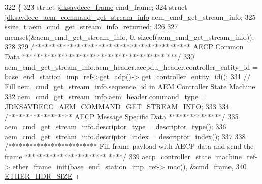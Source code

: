 \begin{DoxyCode}
322 \{
323     \textcolor{keyword}{struct }\hyperlink{structjdksavdecc__frame}{jdksavdecc\_frame} cmd\_frame;
324     \textcolor{keyword}{struct }\hyperlink{structjdksavdecc__aem__command__get__stream__info}{jdksavdecc\_aem\_command\_get\_stream\_info} 
      aem\_cmd\_get\_stream\_info;
325     ssize\_t aem\_cmd\_get\_stream\_info\_returned;
326 
327     memset(&aem\_cmd\_get\_stream\_info, 0, \textcolor{keyword}{sizeof}(aem\_cmd\_get\_stream\_info));
328 
329     \textcolor{comment}{/******************************************** AECP Common Data ****************************************
      ***/}
330     aem\_cmd\_get\_stream\_info.aem\_header.aecpdu\_header.controller\_entity\_id = 
      \hyperlink{classavdecc__lib_1_1descriptor__base__imp_a550c969411f5f3b69f55cc139763d224}{base\_end\_station\_imp\_ref}->\hyperlink{classavdecc__lib_1_1end__station__imp_a471a74540ce6182fad0c17dfd010107e}{get\_adp}()->
      \hyperlink{classavdecc__lib_1_1adp_a0c0959a46658c0a22e9530334b2912da}{get\_controller\_entity\_id}();
331     \textcolor{comment}{// Fill aem\_cmd\_get\_stream\_info.sequence\_id in AEM Controller State Machine}
332     aem\_cmd\_get\_stream\_info.aem\_header.command\_type = 
      \hyperlink{group__command_ga24ecb3f0fabecfdd85f217f77279d2ea}{JDKSAVDECC\_AEM\_COMMAND\_GET\_STREAM\_INFO};
333 
334     \textcolor{comment}{/****************** AECP Message Specific Data ***************/}
335     aem\_cmd\_get\_stream\_info.descriptor\_type = \hyperlink{classavdecc__lib_1_1descriptor__base__imp_aefc543029ab093823c3f5b9d84f0ccc4}{descriptor\_type}();
336     aem\_cmd\_get\_stream\_info.descriptor\_index = \hyperlink{classavdecc__lib_1_1descriptor__base__imp_ac23c0a35276c07cfce8c8660700c2135}{descriptor\_index}();
337 
338     \textcolor{comment}{/************************* Fill frame payload with AECP data and send the frame ***********************
      ****/}
339     \hyperlink{namespaceavdecc__lib_a0b1b5aea3c0490f77cbfd9178af5be22}{aecp\_controller\_state\_machine\_ref}->
      \hyperlink{classavdecc__lib_1_1aecp__controller__state__machine_a86ff947c5e6b799cfb877d3767bfa1f9}{ether\_frame\_init}(\hyperlink{classavdecc__lib_1_1descriptor__base__imp_a550c969411f5f3b69f55cc139763d224}{base\_end\_station\_imp\_ref}->
      \hyperlink{classavdecc__lib_1_1end__station__imp_a08e1bd1861b3b8f447ea374a65ac11f9}{mac}(), &cmd\_frame,
340                                                         \hyperlink{namespaceavdecc__lib_a6c827b1a0d973e18119c5e3da518e65ca9512ad9b34302ba7048d88197e0a2dc0}{ETHER\_HDR\_SIZE} + 

\end{DoxyCode}
